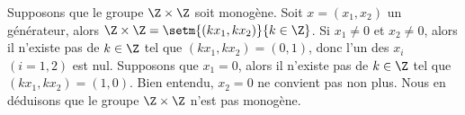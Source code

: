 Supposons que le groupe $\Z \times \Z$ soit monogène. Soit $x = (x_1,x_2)$ un
générateur, alors $\Z \times \Z = \setm{(kx_1,kx_2)}{k \in \Z}$.
Si $x_1\neq 0$ et $x_2\neq 0$, alors il n'existe pas de $k\in\Z$ tel que
$(kx_1,kx_2) = (0,1)$, donc l'un des $x_i$ $(i=1,2)$ est nul. Supposons
que $x_1 = 0$, alors il n'existe pas de $k\in\Z$ tel que $(kx_1,kx_2) = (1,0)$.
Bien entendu, $x_2 = 0$ ne convient pas non plus. 
Nous en déduisons que le groupe $\Z \times \Z$ n'est pas monogène.
